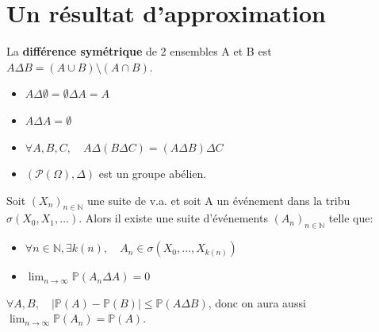 \section{Un résultat d'approximation}
La \textbf{différence symétrique} de 2 ensembles A et B est $A \Delta B = (A \cup B) \setminus (A \cap B)$.
\begin{itemize}
    \item $A \Delta \emptyset = \emptyset \Delta A = A$
    \item $A \Delta A = \emptyset$
    \item $\forall A, B, C, \quad A \Delta (B \Delta C) = (A \Delta B) \Delta C$
    \item $(\mathcal{P}(\Omega), \Delta)$ est un groupe abélien.
\end{itemize}
\begin{proposition}
Soit $(X_n)_{n \in \mathbb{N}}$ une suite de v.a. et soit A un événement dans la tribu $\sigma(X_0, X_1, \dots)$.
Alors il existe une suite d'événements $(A_n)_{n \in \mathbb{N}}$ telle que:
\begin{itemize}
    \item $\forall n \in \mathbb{N}, \exists k(n), \quad A_n \in \sigma(X_0, \dots, X_{k(n)})$
    \item $\lim_{n \to \infty} \mathbb{P}(A_n \Delta A) = 0$
\end{itemize}
\end{proposition}
\begin{remark}
$\forall A, B, \quad |\mathbb{P}(A) - \mathbb{P}(B)| \le \mathbb{P}(A \Delta B)$, donc on aura aussi $\lim_{n \to \infty} \mathbb{P}(A_n) = \mathbb{P}(A)$.
\end{remark}
